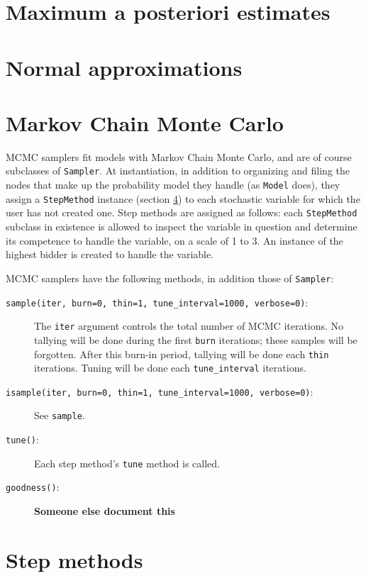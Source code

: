 \section{Maximum a posteriori estimates} 

\section{Normal approximations} 


\section{Markov Chain Monte Carlo}
MCMC samplers fit models with Markov Chain Monte Carlo, and are of course subclasses of \texttt{Sampler}. At instantiation, in addition to organizing and filing the nodes that make up the probability model they handle (as \texttt{Model} does), they assign a \texttt{StepMethod} instance (section \ref{sec:stepmethod}) to each stochastic variable for which the user has not created one. Step methods are assigned as follows: each \texttt{StepMethod} subclass in existence is allowed to inspect the variable in question and determine its competence to handle the variable, on a scale of 1 to 3. An instance of the highest bidder is created to handle the variable.

MCMC samplers have the following methods, in addition those of \texttt{Sampler}:
\begin{description}
    \item[\texttt{sample(iter, burn=0, thin=1, tune\_interval=1000, verbose=0)}:] The \texttt{iter} argument controls the total number of MCMC iterations. No tallying will be done during the first \texttt{burn} iterations; these samples will be forgotten. After this burn-in period, tallying will be done each \texttt{thin} iterations. Tuning will be done each \texttt{tune\_interval} iterations.
    \item[\texttt{isample(iter, burn=0, thin=1, tune\_interval=1000, verbose=0)}:] See \texttt{sample}.
    \item[\texttt{tune()}:] Each step method's \texttt{tune} method is called.
    \item[\texttt{goodness()}:] \textbf{Someone else document this}
\end{description}

\section{Step methods} 
\label{sec:stepmethod} 

